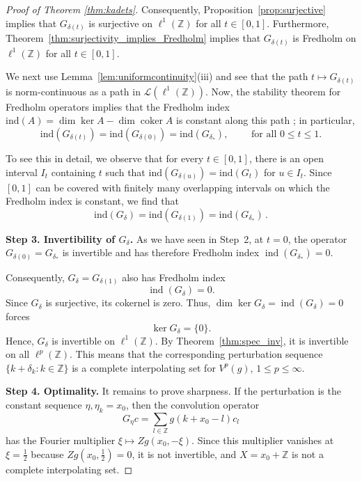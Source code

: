\documentclass[reqno,a4paper,12pt]{amsart}
\numberwithin{equation}{section}
\def\Z{{\mathbb Z}}
\newcommand\1{\mathds{1}}
\begin{document}
\begin{proof}[Proof of Theorem \ref{thm:kadets}]
Consequently, Proposition~\ref{prop:surjective} implies that $G_{\delta
  (t)}$ is
surjective on $\ell^1(\mathbb Z)$ for all $t\in [0,1]$. Furthermore, 
Theorem~\ref{thm:surjectivity_implies_Fredholm} implies that
$G_{\delta (t)}$ is
Fredholm on $\ell^1(\mathbb Z)$ for all $t\in [0,1]$.

 We next use 
Lemma~\ref{lem:uniformcontinuity}(iii) and see that  the path
$t\mapsto G_{\delta(t)}$ is norm-continuous as a path in
$\mathcal L(\ell^1(\mathbb Z))$. Now, the stability theorem for
Fredholm operators implies  that the Fredholm index 
$\mathrm{ind}(A)=\dim\ker A - \dim \operatorname{coker} A $ 
is constant along
this path  \cite[Thm.~5.17]{kato1980perturbation}; in particular, 
\begin{equation}\label{eq:const_ind}
    \mathrm{ind}(G_{\delta(t)}) = \mathrm{ind}(G_{\delta(0)}) = \mathrm{ind}(G_{\delta_*}), \qquad
    \text{ for all }  0\leq t\leq 1.
  \end{equation}

   To see this in detail, we observe that for every $t\in [0,1]$, there
  is an open interval $I_t$ containing $t$ such that $
  \mathrm{ind}(G_{\delta(u)})= \mathrm{ind}(G_{t})$ for $u\in
  I_t$. Since $[0,1]$ can be covered with finitely many overlapping
  intervals on which the Fredholm index is constant, %
 we find that
  $$
  \mathrm{ind}(G_{\delta }) =    \mathrm{ind}(G_{\delta (1)}) =   \mathrm{ind}(G_{\delta_*}) 
 \, .
  $$

\textbf{Step 3. Invertibility of $G_\delta $.} As we have seen in Step~2, at $t=0$, the operator $G_{\delta(0)} =
G_{\delta_*}$ is invertible and has therefore Fredholm index 
$\operatorname{ind}(G_{\delta_*}) = 0$. 

Consequently,  $G_\delta = G_{\delta(1)}$ also has Fredholm index
$$
    \operatorname{ind}(G_\delta)=0 .
$$
Since $G_\delta$ is surjective, its cokernel is zero. Thus, $\dim\ker G_\delta = \operatorname{ind}(G_\delta) = 0$ forces
$$
    \ker G_\delta=\{0\}.
$$
Hence, $G_\delta$ is invertible on $\ell^1(\mathbb Z)$. By
Theorem~\ref{thm:spec_inv}, it is invertible on all $\ell^p(\mathbb
Z)$. This means that the corresponding perturbation sequence
$\{k+\delta _k: k\in \Z\}$ is a complete interpolating set for
$V^p(g)$, $1\leq p\leq \infty $. 

\textbf{Step 4. Optimality.}
It remains to prove sharpness. If the perturbation is the constant
sequence  $\eta ,   \eta _k =  x_0$,   
then the   convolution operator 
$$
 G_\eta  c = \sum _{l\in \Z}   g(k+x_0-l) c_l
$$
has the  Fourier multiplier 
$
    \xi\mapsto Zg(x_0,-\xi).
$
Since this multiplier vanishes at $\xi=\frac12$ because
$Zg(x_0,\frac12)=0$, it is not invertible, and 
 $X= x_0+\Z$ is not a complete interpolating set.
\end{proof}
\end{document}
